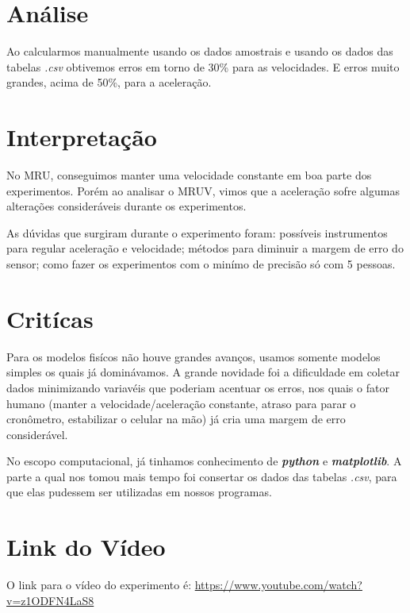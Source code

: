 \documentclass[a4paper, 12pt]{article}
\begin{document}
\section*{Análise}
Ao calcularmos manualmente usando os dados amostrais e usando os dados das
tabelas \textit{.csv} obtivemos erros em torno de 30\% para as velocidades.
E erros muito grandes, acima de 50\%, para a aceleração. 

\section*{Interpretação}
No MRU, conseguimos manter uma velocidade constante em boa parte dos experimentos.
Porém ao analisar o MRUV, vimos que a aceleração sofre algumas alterações
consideráveis durante os experimentos.

As dúvidas que surgiram durante o experimento foram: possíveis instrumentos para
regular aceleração e velocidade; métodos para diminuir a margem de erro do
sensor; como fazer os experimentos com o minímo de precisão só com 5 pessoas.

\section*{Critícas}
Para os modelos fisícos não houve grandes avanços, usamos somente modelos
simples os quais já dominávamos. A grande novidade foi a dificuldade em coletar
dados minimizando variavéis que poderiam acentuar os erros, nos quais o fator
humano (manter a velocidade/aceleração constante, atraso para parar o
cronômetro, estabilizar o celular na mão) já cria uma margem de erro considerável. 

No escopo computacional, já tinhamos conhecimento de \textit{\textbf{python}} e
\textit{\textbf{matplotlib}}. A parte a qual nos tomou mais tempo foi consertar
os dados das tabelas \textit{.csv}, para que elas pudessem ser utilizadas em
nossos programas.

\section*{Link do Vídeo}
O link para o vídeo do experimento é:
\url{https://www.youtube.com/watch?v=z1ODFN4LaS8}
\end{document}
